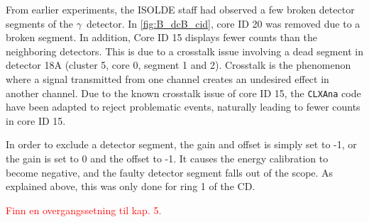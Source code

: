 \documentclass[twoside,english]{uiofysmaster/uiofysmaster}
\newcommand{\Sm}{$^{140}$Sm} %
\newcommand{\Pb}{$^{208}$Pb}
\newcommand{\ga}{$\gamma$}
\let\orgautoref\autoref
\renewcommand{\autoref}
        {%
		 \def\sectionautorefname{Section}%
		 \def\subsectionautorefname{Section}%
		 \def\subsubsectionautorefname{Section}%
		 \def\chapterautorefname{Chapter}%
          \orgautoref}
\begin{document}
From earlier experiments, the ISOLDE staff had observed a few broken detector segments of the \ga\ detector.
In \autoref{fig:B_dcB_cid}, core ID 20 was removed due to a broken segment. 
In addition, Core ID 15 displays fewer counts than the neighboring detectors.
This is due to a crosstalk issue involving a dead segment in detector 18A (cluster 5, core 0, segment 1 and 2). 
Crosstalk is the phenomenon where a signal transmitted from one channel creates an undesired effect in another channel. 
Due to the known crosstalk issue of core ID 15, the \texttt{CLXAna} code have been adapted to reject problematic events, naturally leading to fewer counts in core ID 15.

In order to exclude a detector segment, the gain and offset is simply set to -1, or the gain is set to 0 and the offset to -1.
It causes the energy calibration to become negative, and the faulty detector segment falls out of the scope. 
As explained above, this was only done for ring 1 of the CD.

\bigskip

\textcolor{red}{Finn en overgangssetning til kap. 5.}



\end{document}
